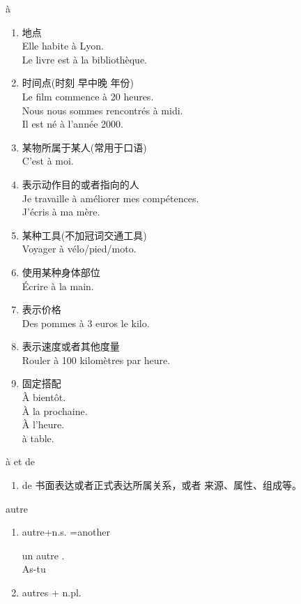 \documentclass[../templates/main.tex]{subfiles}
\begin{document}
\begin{sentence}\label{se:àuaé}
	\begin{grammar}{à}
		\begin{enumerate}
			\item 地点\\
			      Elle habite à Lyon.\\
			      Le livre est à la bibliothèque.
			\item 时间点(时刻 早中晚 年份)\\
			      Le film commence à 20 heures.\\
			      Nous nous sommes rencontrés à midi.\\
			      Il est né à l'année 2000.
			\item 某物所属于某人(常用于口语)\\
			      C'est à moi.
			\item 表示动作目的或者指向的人\\
			      Je travaille à améliorer mes compétences.\\
			      J'écris à ma mère.
			\item 某种工具(不加冠词交通工具)\\
			      Voyager à vélo/pied/moto.\\
			\item 使用某种身体部位\\
			      Écrire à la main.
			\item 表示价格\\
			      Des pommes à 3 euros le kilo.
			\item 表示速度或者其他度量\\
			      Rouler à 100 kilomètres par heure.
			\item 固定搭配\\
			      À bientôt.\\
			      À la prochaine.\\
			      À l'heure.\\
			      à table.
		\end{enumerate}
		\begin{grammar}{à et de}
			\begin{enumerate}
				\item de 书面表达或者正式表达所属关系，或者
				      来源、属性、组成等。
			\end{enumerate}
		\end{grammar}
		\begin{grammar}{autre}
			\begin{enumerate}
				\item autre+n.s. =another\\
				      \begin{french}
					      un autre .\\
					      As-tu   
				      \end{french}
				\item autres + n.pl. \\


\end{enumerate}
\end{grammar}
\end{grammar}
\end{sentence}
\end{document}
